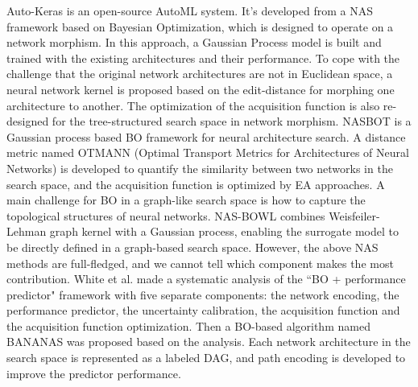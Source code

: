 \documentclass[journal]{IEEEtran}
\begin{document}
Auto-Keras \cite{jin2019auto} is an open-source AutoML system. It's developed from a NAS framework based on Bayesian Optimization, which is designed to operate on a network morphism. In this approach, a Gaussian Process model is built and trained with the existing architectures and their performance. To cope with the challenge that the original network architectures are not in Euclidean space, a neural network kernel is proposed based on the edit-distance for morphing one architecture to another. The optimization of the acquisition function is also re-designed for the tree-structured search space in network morphism.
NASBOT \cite{kandasamy2018neural} is a Gaussian process based BO framework for neural architecture search. A distance metric named OTMANN (Optimal Transport Metrics for Architectures of Neural Networks) is developed to quantify the similarity between two networks in the search space, and the acquisition function is optimized by EA approaches. A main challenge for BO in a graph-like search space is how to capture the topological structures of neural networks. NAS-BOWL \cite{ru2020interpretable} combines Weisfeiler-Lehman graph kernel with a Gaussian process, enabling the surrogate model to be directly defined in a graph-based search space.
However, the above NAS methods are full-fledged, and we cannot tell which component makes the most contribution. White et al. \cite{white2021bananas} made a systematic analysis of the ``BO + performance predictor" framework with five separate components: the network encoding, the performance predictor, the uncertainty calibration, the acquisition function and the acquisition function optimization. Then a BO-based algorithm named BANANAS was proposed based on the analysis. Each network architecture in the search space is represented as a labeled DAG, and path encoding is developed to improve the predictor performance. 
\end{document}
